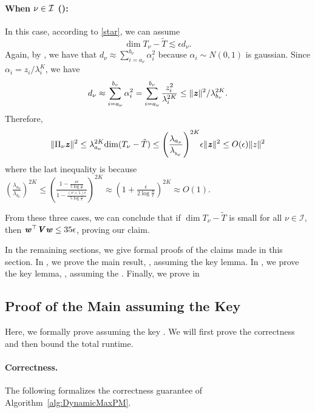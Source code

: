 \begin{enumerate}
\paragraph{When $\nu\in{\cal I}$ ():}

In this case, according to \eqref{star}, we can assume $$\dim{T_{\nu}-\tilde{T}}\lesssim\epsilon d_{\nu}.$$
Again, by , we have that $d_{\nu}\approx\sum_{i=a_{\nu}}^{b_{\nu}}\alpha_{i}^{2}$ because $\alpha_{i}\sim N(0,1)$ is gaussian. Since $\alpha_{i}=z_{i}/\lambda_{i}^{K}$, we have
\[
d_{\nu}\approx\sum_{i=a_{\nu}}^{b_{\nu}}\alpha_{i}^{2}=\sum_{i=a_{\nu}}^{b_{\nu}}\frac{z_{i}^{2}}{\lambda_{i}^{2K}}\le\|\boldsymbol{\mathit{z}}\|^{2}/\lambda_{b_{\nu}}^{2K}.
\]
Therefore,
\[
\|\Pi_{\nu}\zz\|^2\le\lambda_{a_{\nu}}^{2K}\dim{T_{\nu}-\tilde{T}}\le\left(\frac{\lambda_{a_{\nu}}}{\lambda_{_{b_{\nu}}}}\right)^{2K}\epsilon\|\zz\|^{2}\le O(\epsilon)\|z\|^{2}
\]
where the last inequality is because $\ensuremath{\left(\frac{\lambda_{a_{\nu}}}{\lambda_{b_{\nu}}}\right)^{2K}\leq\left(\frac{1-\frac{\nu\epsilon}{5\log\frac{n}{\epsilon}}}{1-\frac{(\nu+1)\epsilon}{5\log\frac{n}{\epsilon}}}\right)^{2K}\approx\left(1+\frac{\epsilon}{2\log\frac{n}{\epsilon}}\right)^{2K}\approx O(1)}.$

\end{enumerate}
From these three cases, we can conclude that if $\dim{T_{\nu}-\tilde{T}}$ is small for all $\nu\in \mathcal{I}$, then $\boldsymbol{\mathit{w}}^{\top}\boldsymbol{\mathit{V}}\boldsymbol{\mathit{w}} \leq 35\epsilon$, proving our claim.

In the remaining sections, 
we give formal proofs of the claims made in this section. In , we prove the main result, , assuming the key lemma. In , we prove the key lemma, , assuming the . Finally, we prove  in 


\subsection{Proof of the Main  assuming the Key }\label{sec:correct}

Here, we formally prove  assuming the key . We will first prove the correctness and then bound the total runtime.


\paragraph{Correctness.}
The following formalizes the correctness guarantee of  Algorithm~\ref{alg:DynamicMaxPM}. 

